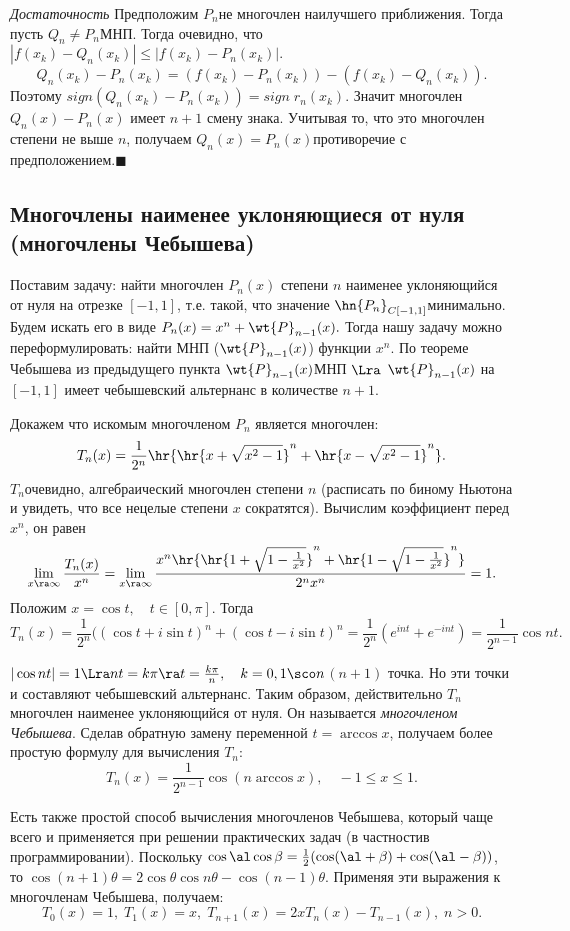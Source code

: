 \documentclass[a4paper]{article}
\begin{document}
\emph{Достаточность} Предположим $P_n$\т не многочлен наилучшего
приближения. Тогда пусть $Q_n\neq P_n$\т МНП. Тогда очевидно, что
$|f(x_k)-Q_n(x_k)|\le|f(x_k)-P_n(x_k)|.$
$$Q_n(x_k)-P_n(x_k)=(f(x_k)-P_n(x_k))-(f(x_k)-Q_n(x_k)).$$
Поэтому $sign(Q_n(x_k)-P_n(x_k))=sign\; r_n(x_k)$. Значит
многочлен $Q_n(x)-P_n(x)$ имеет $n+1$ смену знака. Учитывая то,
что это многочлен степени не выше $n$, получаем $Q_n(x)=P_n(x)$\т противоречие с предположением.$\blacksquare$

\subsection{Многочлены наименее уклоняющиеся от нуля (многочлены Чебышева)}
Поставим задачу: найти многочлен $P_n(x)$ степени $n$ наименее
уклоняющийся от нуля на отрезке $[-1,1]$, т.е. такой, что значение
$\hn{P_n}_{C[-1,1]}$\т минимально. Будем искать его в виде
$P_n(x)=x^n+\wt{P}_{n-1}(x).$ Тогда нашу задачу можно
переформулировать: найти МНП ($\wt{P}_{n-1}(x)$) функции
$x^n$. По теореме Чебышева из предыдущего пункта
$\wt{P}_{n-1}(x)$\т МНП $\Lra$
$\wt{P}_{n-1}(x)$ на $[-1,1]$ имеет чебышевский альтернанс
в количестве $n+1$.

Докажем что искомым многочленом $P_n$ является многочлен:
$$T_n(x)=\frac1{2^n}\hr{\hr{x+\sqrt{x^2-1}}^n+\hr{x-\sqrt{x^2-1}}^n}.$$
$T_n$\т очевидно, алгебраический многочлен степени $n$ (расписать
по биному Ньютона и увидеть, что все нецелые степени $x$
сократятся). Вычислим коэффициент перед $x^n$, он равен
$$\lim_{x\ra\infty}\frac{T_n(x)}{x^n}=\lim_{x\ra\infty}\frac{x^n\hr{\hr{1+\sqrt{1-\frac1{x^2}}}^n+\hr{1-\sqrt{1-\frac1{x^2}}}^n}}{2^nx^n}=1.$$
Положим $x=\cos t,\quad t\in[0,\pi]$. Тогда
$$T_n(x)=\frac1{2^n}((\cos t+i\sin t)^n+(\cos t-i\sin
t)^n=\frac1{2^n}(e^{int}+e^{-int})=\frac1{2^{n-1}}\cos nt.$$

$|\cos nt|=1\Lra nt=k\pi\ra t=\frac{k\pi}n,\quad k=0,1\sco n$\т $(n+1)$ точка. Но эти
точки и составляют чебышевский альтернанс. Таким образом, действительно $T_n$\т многочлен наименее
уклоняющийся от нуля. Он называется \emph{многочленом Чебышева}. Сделав обратную замену переменной $t=\arccos
x$, получаем более простую формулу для вычисления $T_n$:
$$T_n(x)=\frac1{2^{n-1}}\cos(n\arccos x),\quad -1\le x\le1.$$

Есть также простой способ вычисления многочленов Чебышева, который
чаще всего и применяется при решении практических задач (в
частности\т в программировании). Поскольку
$\cos\al\cos\beta=\frac12(\cos(\al+\beta)+\cos(\al-\beta))$,
то $\cos(n+1)\theta=2\cos\theta\cos n\theta-\cos(n-1)\theta.$
Применяя эти выражения к многочленам Чебышева, получаем:
$$T_0(x)=1,\;T_1(x)=x,\;T_{n+1}(x)=2xT_n(x)-T_{n-1}(x),\;n>0.$$
\end{document}
